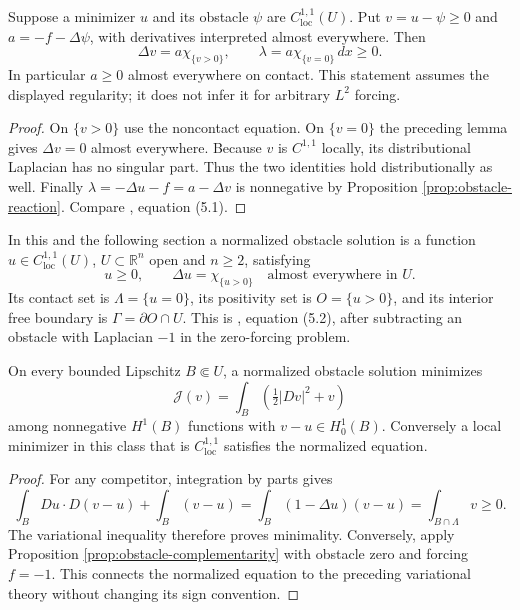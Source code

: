 \begin{proposition}\label{prop:obstacle-complementarity}
Suppose a minimizer $u$ and its obstacle $\psi$ are $C^{1,1}_{\mathrm{loc}}(U)$. Put $v=u-\psi\geq0$ and $a=-f-\Delta\psi$, with derivatives interpreted almost everywhere. Then
\[
 \Delta v=a\chi_{\{v>0\}},\qquad
 \lambda=a\chi_{\{v=0\}}\,dx\geq0.
\]
In particular $a\geq0$ almost everywhere on contact. This statement assumes the displayed regularity; it does not infer it for arbitrary $L^2$ forcing.
\end{proposition}
\begin{proof}
On $\{v>0\}$ use the noncontact equation. On $\{v=0\}$ the preceding lemma gives $\Delta v=0$ almost everywhere. Because $v$ is $C^{1,1}$ locally, its distributional Laplacian has no singular part. Thus the two identities hold distributionally as well. Finally $\lambda=-\Delta u-f=a-\Delta v$ is nonnegative by Proposition \ref{prop:obstacle-reaction}. Compare \cite{Fig18}, equation (5.1).
\end{proof}

\begin{definition}\label{def:normalized-obstacle}
In this and the following section a normalized obstacle solution is a function $u\in C^{1,1}_{\mathrm{loc}}(U)$, $U\subset\mathbb R^n$ open and $n\geq2$, satisfying
\[
 u\geq0,\qquad \Delta u=\chi_{\{u>0\}}\quad\text{almost everywhere in }U.
\]
Its contact set is $\Lambda=\{u=0\}$, its positivity set is $O=\{u>0\}$, and its interior free boundary is $\Gamma=\partial O\cap U$. This is \cite{Fig18}, equation (5.2), after subtracting an obstacle with Laplacian $-1$ in the zero-forcing problem.
\end{definition}

\begin{proposition}\label{prop:normalized-obstacle-minimizes}
On every bounded Lipschitz $B\Subset U$, a normalized obstacle solution minimizes
\[
 \mathcal J(v)=\int_B\left(\tfrac12|Dv|^2+v\right)
\]
among nonnegative $H^1(B)$ functions with $v-u\in H^1_0(B)$. Conversely a local minimizer in this class that is $C^{1,1}_{\mathrm{loc}}$ satisfies the normalized equation.
\end{proposition}
\begin{proof}
For any competitor, integration by parts gives
\[
 \int_B Du\cdot D(v-u)+\int_B(v-u)
 =\int_B(1-\Delta u)(v-u)=\int_{B\cap\Lambda}v\geq0.
\]
The variational inequality therefore proves minimality. Conversely, apply Proposition \ref{prop:obstacle-complementarity} with obstacle zero and forcing $f=-1$. This connects the normalized equation to the preceding variational theory without changing its sign convention.
\end{proof}

